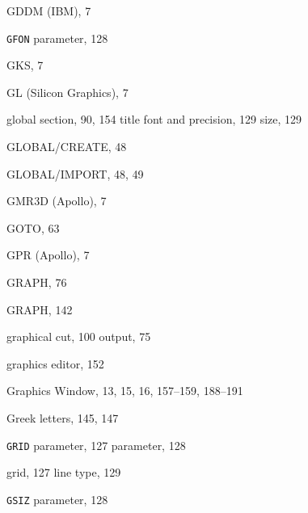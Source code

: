 \begin{theindex}
  \item GDDM (IBM), 7
  \item {\tt GFON}
     parameter, 128
  \item GKS, 7
  \item GL (Silicon Graphics), 7
  \item global
    \subitem section, 90, 154
    \subitem title
      \subsubitem font and precision, 129
      \subsubitem size, 129
  \item {\ttfamily  GLOBAL/CREATE}, 48
  \item {\ttfamily  GLOBAL/IMPORT}, 48, 49
  \item GMR3D (Apollo), 7
  \item {\ttfamily  GOTO}, 63
  \item GPR (Apollo), 7
  \item GRAPH, 76
  \item {\ttfamily  GRAPH}, 142
  \item graphical
    \subitem cut, 100
    \subitem output, 75
  \item graphics
    \subitem editor, 152
  \item Graphics Window, 13, 15, 16, 157--159, 188--191
  \item Greek letters, 145, 147
  \item {\tt GRID}
     parameter, 127
     parameter, 128
  \item grid, 127
    \subitem line type, 129
  \item {\tt GSIZ}
     parameter, 128

  \indexspace


\end{theindex}
